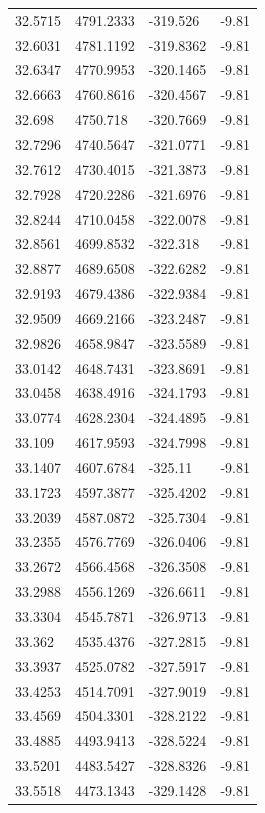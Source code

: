 \begin{table}[H]
\begin{tabular}{llll}
32.5715 & 4791.2333 & -319.526 & -9.81 \\
32.6031 & 4781.1192 & -319.8362 & -9.81 \\
32.6347 & 4770.9953 & -320.1465 & -9.81 \\
32.6663 & 4760.8616 & -320.4567 & -9.81 \\
32.698 & 4750.718 & -320.7669 & -9.81 \\
32.7296 & 4740.5647 & -321.0771 & -9.81 \\
32.7612 & 4730.4015 & -321.3873 & -9.81 \\
32.7928 & 4720.2286 & -321.6976 & -9.81 \\
32.8244 & 4710.0458 & -322.0078 & -9.81 \\
32.8561 & 4699.8532 & -322.318 & -9.81 \\
32.8877 & 4689.6508 & -322.6282 & -9.81 \\
32.9193 & 4679.4386 & -322.9384 & -9.81 \\
32.9509 & 4669.2166 & -323.2487 & -9.81 \\
32.9826 & 4658.9847 & -323.5589 & -9.81 \\
33.0142 & 4648.7431 & -323.8691 & -9.81 \\
33.0458 & 4638.4916 & -324.1793 & -9.81 \\
33.0774 & 4628.2304 & -324.4895 & -9.81 \\
33.109 & 4617.9593 & -324.7998 & -9.81 \\
33.1407 & 4607.6784 & -325.11 & -9.81 \\
33.1723 & 4597.3877 & -325.4202 & -9.81 \\
33.2039 & 4587.0872 & -325.7304 & -9.81 \\
33.2355 & 4576.7769 & -326.0406 & -9.81 \\
33.2672 & 4566.4568 & -326.3508 & -9.81 \\
33.2988 & 4556.1269 & -326.6611 & -9.81 \\
33.3304 & 4545.7871 & -326.9713 & -9.81 \\
33.362 & 4535.4376 & -327.2815 & -9.81 \\
33.3937 & 4525.0782 & -327.5917 & -9.81 \\
33.4253 & 4514.7091 & -327.9019 & -9.81 \\
33.4569 & 4504.3301 & -328.2122 & -9.81 \\
33.4885 & 4493.9413 & -328.5224 & -9.81 \\
33.5201 & 4483.5427 & -328.8326 & -9.81 \\
33.5518 & 4473.1343 & -329.1428 & -9.81 \\

\end{tabular}
\end{table}
